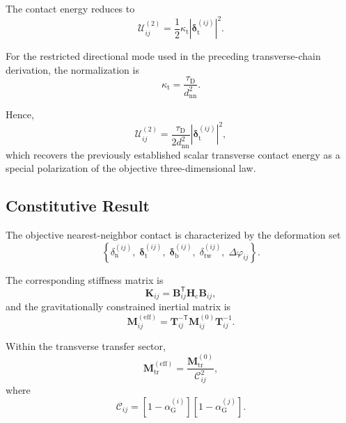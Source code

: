 The contact energy reduces to
\begin{equation}
    \mathcal{U}_{ij}^{(2)} = \frac{1}{2} \kappa_{\mathrm{t}} \left| \boldsymbol{\delta}_{\mathrm{t}}^{(ij)} \right|^2.
\end{equation}

For the restricted directional mode used in the preceding transverse-chain derivation, the normalization is
\begin{equation}
    \boxed{ \kappa_{\mathrm{t}} = \frac{\tau_{\mathrm{D}}}{d_{\mathrm{nn}}^2} }.
\end{equation}

Hence,
\begin{equation}
    \mathcal{U}_{ij}^{(2)} = \frac{\tau_{\mathrm{D}}}{2d_{\mathrm{nn}}^2} \left| \boldsymbol{\delta}_{\mathrm{t}}^{(ij)} \right|^2,
\end{equation}
which recovers the previously established scalar transverse contact energy as a special polarization of the objective three-dimensional law.

\subsection{Constitutive Result}

The objective nearest-neighbor contact is characterized by the deformation set
\begin{equation}
    \boxed{ \left\{ \delta_{\mathrm{n}}^{(ij)}, \; \boldsymbol{\delta}_{\mathrm{t}}^{(ij)}, \; \boldsymbol{\delta}_{\mathrm{b}}^{(ij)}, \; \delta_{\mathrm{tw}}^{(ij)}, \; \Delta\varphi_{ij} \right\} }.
\end{equation}

The corresponding stiffness matrix is
\begin{equation}
    \boxed{ \mathbf{K}_{ij} = \mathbf{B}_{ij}^{\mathsf{T}} \mathbf{H}_{\mathrm{c}} \mathbf{B}_{ij} },
\end{equation}
and the gravitationally constrained inertial matrix is
\begin{equation}
    \boxed{ \mathbf{M}_{ij}^{(\mathrm{eff})} = \mathbf{T}_{ij}^{-\mathsf{T}} \mathbf{M}_{ij}^{(0)} \mathbf{T}_{ij}^{-1} }.
\end{equation}

Within the transverse transfer sector,
\begin{equation}
    \boxed{ \mathbf{M}_{\mathrm{tr}}^{(\mathrm{eff})} = \frac{ \mathbf{M}_{\mathrm{tr}}^{(0)} }{ \mathcal{C}_{ij}^2 } },
\end{equation}
where
\begin{equation}
    \boxed{ \mathcal{C}_{ij} = \left[ 1-\alpha_{\mathrm{G}}^{(i)} \right] \left[ 1-\alpha_{\mathrm{G}}^{(j)} \right] }.
\end{equation}

